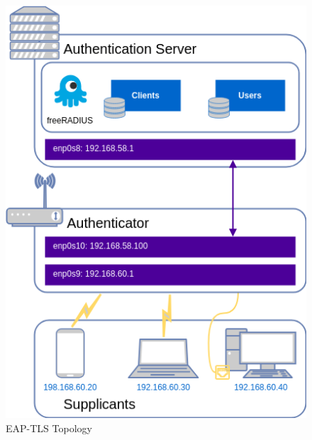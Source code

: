 \begin{figure}
    \centering
    \includegraphics[width=0.5\linewidth]{figs/topology-EAP.png}
    \caption{\ac{EAP-TLS} Topology}
    \label{fig:EAP-TLS-topology}
\end{figure}


